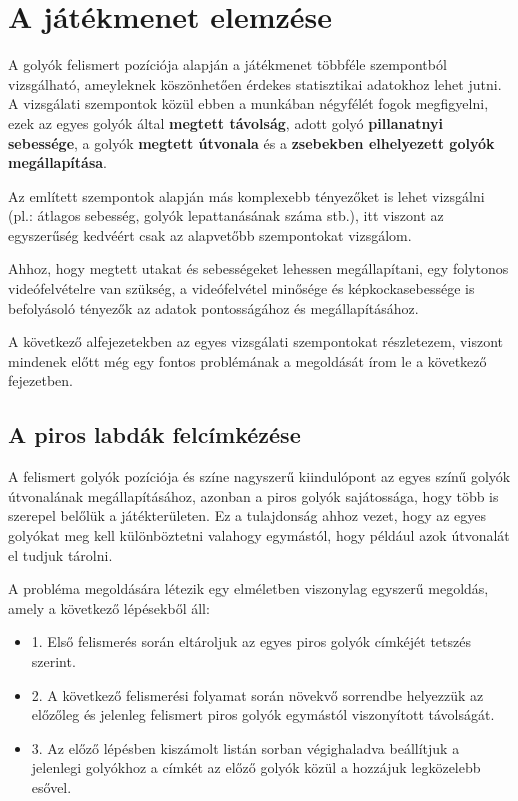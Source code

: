 \section{A játékmenet elemzése}
A golyók felismert pozíciója alapján a játékmenet többféle szempontból vizsgálható, ameyleknek köszönhetően érdekes statisztikai adatokhoz lehet jutni. A vizsgálati szempontok közül ebben a munkában négyfélét fogok megfigyelni, ezek az egyes golyók által \textbf{megtett távolság}, adott golyó \textbf{pillanatnyi sebessége}, a golyók \textbf{megtett útvonala} és a \textbf{zsebekben elhelyezett golyók megállapítása}.
\par Az említett szempontok alapján más komplexebb tényezőket is lehet vizsgálni (pl.: átlagos sebesség, golyók lepattanásának száma stb.), itt viszont az egyszerűség kedvéért csak az alapvetőbb szempontokat vizsgálom.
\par Ahhoz, hogy megtett utakat és sebességeket lehessen megállapítani, egy folytonos videófelvételre van szükség, a videófelvétel minősége és képkockasebessége is befolyásoló tényezők az adatok pontosságához és megállapításához.
\par A következő alfejezetekben az egyes vizsgálati szempontokat részletezem, viszont mindenek előtt még egy fontos problémának a megoldását írom le a következő fejezetben.

\subsection{A piros labdák felcímkézése}
A felismert golyók pozíciója és színe nagyszerű kiindulópont az egyes színű golyók útvonalának megállapításához, azonban a piros golyók sajátossága, hogy több is szerepel belőlük a játékterületen. Ez a tulajdonság ahhoz vezet, hogy az egyes golyókat meg kell különböztetni valahogy egymástól, hogy például azok útvonalát el tudjuk tárolni.
\par A probléma megoldására létezik egy elméletben viszonylag egyszerű megoldás, amely a következő lépésekből áll:

\begin{itemize}
    \item 1. Első felismerés során eltároljuk az egyes piros golyók címkéjét tetszés szerint.
    \item 2. A következő felismerési folyamat során növekvő sorrendbe helyezzük az előzőleg és jelenleg felismert piros golyók egymástól viszonyított távolságát.
    \item 3. Az előző lépésben kiszámolt listán sorban végighaladva beállítjuk a jelenlegi golyókhoz a címkét az előző golyók közül a hozzájuk legközelebb esővel.
\end{itemize}

